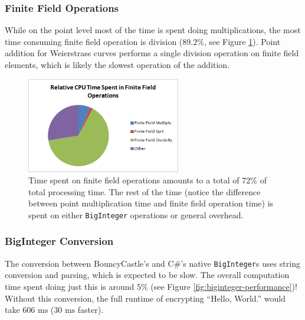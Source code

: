 \subsubsection{Finite Field Operations}
\label{sec:performance_components_finitefield}

While on the point level most of the time is spent doing multiplications, the most time consuming finite field operation is division
(\(89.2\%\), see Figure \ref{fig:finite-field-performance}). Point addition for Weierstrass curves performs a single division operation
on finite field elements, which is likely the slowest operation of the addition.

\begin{figure}[htb]
	\centering
	\includegraphics[width=0.6\textwidth]{performance/finite-field--relative-time}
	\caption{Time spent on finite field operations amounts to a total of \(72\%\) of total processing time. The rest of the time (notice the
		difference between point multiplication time and finite field operation time) is spent on either \texttt{BigInteger} operations or 
		general overhead.}
	\label{fig:finite-field-performance}
\end{figure}

\subsubsection{BigInteger Conversion}
\label{sec:performance_components_biginteger}

The conversion between BouncyCastle's and C\#'s native \texttt{BigInteger}s uses string conversion and parsing, which is expected to be slow.
The overall computation time spent doing just this is around \(5\%\) (see Figure \ref{fig:biginteger-performance})! Without this conversion,
the full runtime of encrypting ``Hello, World.'' would take \(606 \text{ ms}\) (\(30 \text{ ms}\) faster).

